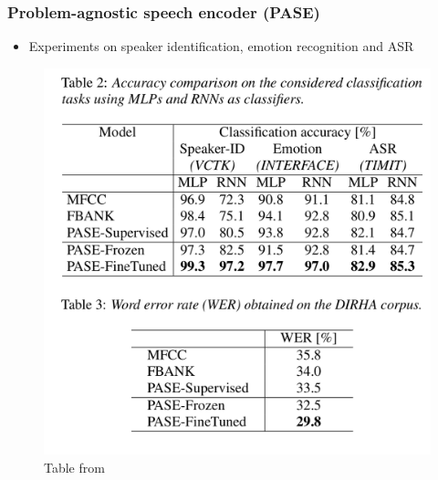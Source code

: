 \documentclass[table]{beamer}
\begin{document}
\begin{frame}
\frametitle{Problem-agnostic speech encoder (PASE)}

		\begin{itemize}
			\item Experiments on speaker identification, emotion recognition and ASR
		\end{itemize} 


		\begin{figure}
			\centering
			\includegraphics[scale=0.3]	{PASEexp} 
			\caption{Table from \citep{pascual2019}}
			\end{figure}

\end{frame}
\end{document}
